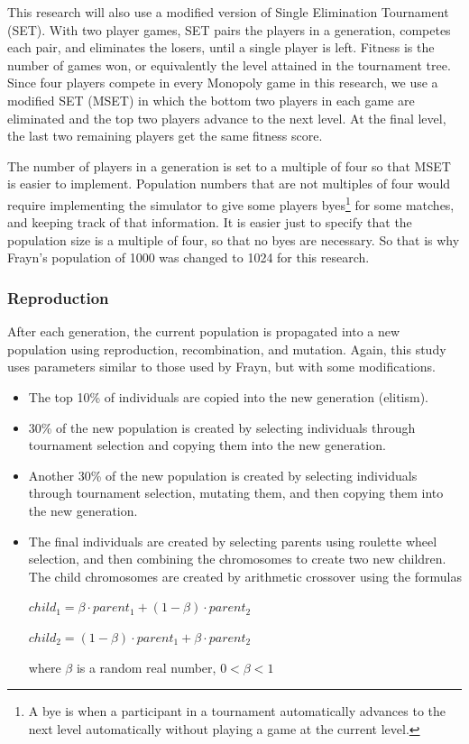 This research will also use a modified version of Single Elimination Tournament
(SET). With two player games, SET pairs the players in a generation, competes
each pair, and eliminates the losers, until a single player is left.
Fitness is the number of games won, or equivalently the level attained in the
tournament tree. Since four players compete in every Monopoly game in this
research, we use a modified SET (MSET) in which the bottom two players in each
game are eliminated and the top two players advance to the next level. At the
final level, the last two remaining players get the same fitness score.

The number of players in a generation is set to a multiple of four so that
MSET is easier to implement. Population numbers that are not multiples of
four would require implementing the simulator to give some players
byes\footnote{A bye is when a participant in a tournament automatically
advances to the next level automatically without playing a game at the current
level.} for some matches, and keeping track of that information. It is easier
just to specify that the population size is a multiple of four, so that no byes
are necessary. So that is why Frayn's population of 1000 was changed to 1024 for
this research.

\subsubsection{Reproduction}

After each generation, the current population is propagated into a new
population using reproduction, recombination, and mutation. Again, this study
uses parameters similar to those used by Frayn, but with some modifications.

\begin{itemize}
  \item {The top 10\% of individuals are copied into the new generation
  (elitism).}
  \item {30\% of the new population is created by selecting individuals through
  tournament selection and copying them into the new generation.}
  \item {Another 30\% of the new population is created by selecting individuals
  through tournament selection, mutating them, and then copying them into the new
  generation.}
  \item {The final individuals are created by selecting parents using
  roulette wheel selection, and then combining the chromosomes to create two
  new children. The child chromosomes are created by arithmetic crossover using
  the formulas 
  
\(child_{1} = \beta \cdot parent_{1} + (1 - \beta ) \cdot parent_{2}\)

\(child_{2} = (1 - \beta ) \cdot parent_{1} + \beta \cdot parent_{2}\)

where \(\beta\) is a random real number, \(0 < \beta < 1\)}
\end{itemize}

